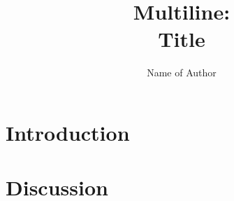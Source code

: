 \documentclass{format/ruthesis}
\begin{document}
\phd

\title{Multiline:\\
	Title}
\author{Name of Author}
\abstract{}
\beforepreface
\acknowledgements{}
\dedication{}

\tablespage
\figurespage

\afterpreface
\FloatBarrier





\chapter{Introduction}
\label{chap:intro}
%

\FloatBarrier




\chapter{Discussion}
\label{chap:discussion}

\FloatBarrier


\begingroup{}


\endgroup
\end{document}
